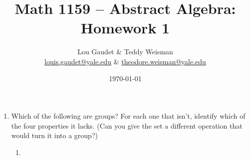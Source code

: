\documentclass[10pt, letterpaper]{article}
\begin{document}
\title{Math 1159 -- Abstract Algebra: Homework 1}
\author{Lou Gaudet \& Teddy Weisman \\ \url{louis.gaudet@yale.edu} \& \url{theodore.weisman@yale.edu}}
\date{\today}
\maketitle

\begin{enumerate}

\item Which of the following are groups? For each one that isn't, identify which of the four properties it lacks. (Can you give the set a different operation that would turn it into a group?)
\begin{enumerate}
\item
\end{enumerate}

\end{enumerate}
\end{document}
